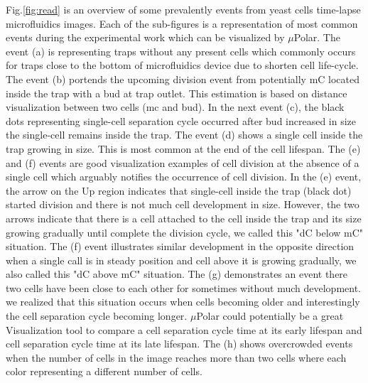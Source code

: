 \documentclass[conference]{IEEEtran}
\begin{document}
Fig.\ref{fig:read} is an overview of some prevalently events from yeast cells time-lapse microfluidics images. Each of the sub-figures is a representation of most common events during the experimental work which can be visualized by $\mu$Polar. The event (a) is representing traps without any present cells which commonly occurs for traps close to the bottom of microfluidics device due to shorten cell life-cycle. The event (b) portends the upcoming division event from potentially mC located inside the trap with a bud at trap outlet. This estimation is based on distance visualization between two cells (mc and bud). In the next event (c), the black dots representing single-cell separation cycle  occurred after bud increased in size the single-cell remains inside the trap. The event (d) shows a single cell inside the trap growing in size. This is most common at the end of the cell lifespan. The (e) and (f) events are good visualization examples of cell division at the absence of a single cell which arguably notifies the occurrence of cell division. In the (e) event, the arrow on the Up region indicates that single-cell inside the trap (black dot) started division and there is not much cell development in size. However, the two arrows indicate that there is a cell attached to the cell inside the trap and its size growing gradually until complete the division cycle, we called this "dC below mC" situation. The (f) event illustrates similar development in the opposite direction when a single call is in steady position and cell above it is growing gradually, we also called this "dC above mC" situation. The (g) demonstrates an event there two cells have been close to each other for sometimes without much development. we realized that this situation occurs when cells becoming older and interestingly the cell separation cycle becoming longer. $\mu$Polar could potentially be a great Visualization tool to compare a cell separation cycle time at its early lifespan and cell separation cycle time at its late lifespan. The (h) shows overcrowded events when the number of cells in the image reaches more than two cells where each color representing a different number of cells.
\end{document}
